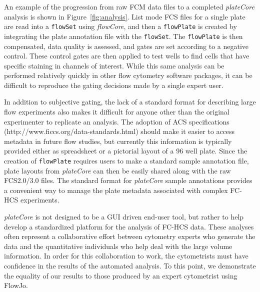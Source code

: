 \documentclass[12pt]{article}
\newcommand{\Robject}[1]{{\texttt{#1}}}
\newcommand{\Rpackage}[1]{{\textit{#1}}}
\begin{document}
An example of the progression from raw FCM data files to a completed \Rpackage{plateCore} analysis is shown in Figure~\ref{fig:analysis}.
List mode FCS files for a single plate are read into a \Robject{flowSet} using \Rpackage{flowCore}, and then a \Robject{flowPlate} is created by integrating
the plate annotation file with the \Robject{flowSet}. The \Robject{flowPlate} is then compensated, data quality is assessed, and gates
are set according to a negative control. These control gates are then applied to test wells to find cells that have specific staining
in channels of interest. While this same analysis can be performed relatively quickly in 
other flow cytometry software packages, it can be difficult to reproduce the gating decisions made by a single expert user.

In addition to subjective gating, the lack of a standard format for describing large flow experiments also
makes it difficult for anyone other than the original experimenter to replicate an analysis. 
The adoption of ACS specifications (http://www.ficcs.org/data-standards.html) should make it easier to access metadata in future flow studies, but currently
this information is typically provided either as spreadsheet or a pictorial layout of a 96 well plate. 
Since the creation of \Robject{flowPlate} requires users to make a standard sample annotation file, plate layouts from \Rpackage{plateCore}
can then be easily shared along with the raw FCS2.0/3.0 files. 
The standard format for \Rpackage{plateCore} sample annotations provides a convenient way to manage the plate metadata
associated with complex FC-HCS experiments.

\Rpackage{plateCore} is not designed to be a GUI driven end-user tool, but rather to help develop a standardized platform for the analysis of FC-HCS data.
These analyses often represent a collaborative effort between cytometry experts who generate the data and the quantitative individuals who help
deal with the large volume information. In order for this collaboration to work, the cytometrists must have confidence in the
results of the automated analysis. To this point, we demonstrate the equality of our results to those produced by an expert
cytometrist using FlowJo\texttrademark.
\end{document}
